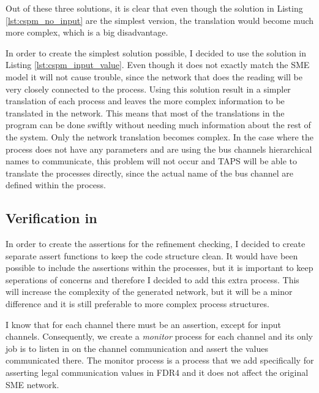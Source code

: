 Out of these three solutions, it is clear that even though the solution in Listing \ref{lst:cspm_no_input} are the simplest version, the translation would become much more complex, which is a big disadvantage.

In order to create the simplest solution possible, I decided to use the solution in Listing \ref{lst:cspm_input_value}. Even though it does not exactly match the SME model it will not cause trouble, since the network that does the reading will be very closely connected to the process. Using this solution result in a simpler translation of each process and leaves the more complex information to be translated in the network. This means that most of the translations in the program can be done swiftly without needing much information about the rest of the system. Only the network translation becomes complex.
In the case where the process does not have any parameters and are using the bus channels hierarchical names to communicate, this problem will not occur and TAPS will be able to translate the processes directly, since the actual name of the bus channel are defined within the process.

\subsection{Verification in \cspm{}}


In order to create the assertions for the refinement checking, I decided to create separate assert functions to keep the code structure clean. It would have been possible to include the assertions within the processes, but it is important to keep seperations of concerns and therefore I decided to add this extra process. This will increase the complexity of the generated \cspm{} network, but it will be a minor difference and it is still preferable to more complex process structures.

I know that for each \cspm{} channel there must be an assertion, except for input channels. Consequently, we create a \textit{monitor} process for each channel and its only job is to listen in on the channel communication and assert the values communicated there. The monitor process is a process that we add specifically for asserting legal communication values in FDR4 and it does not affect the original SME network.

